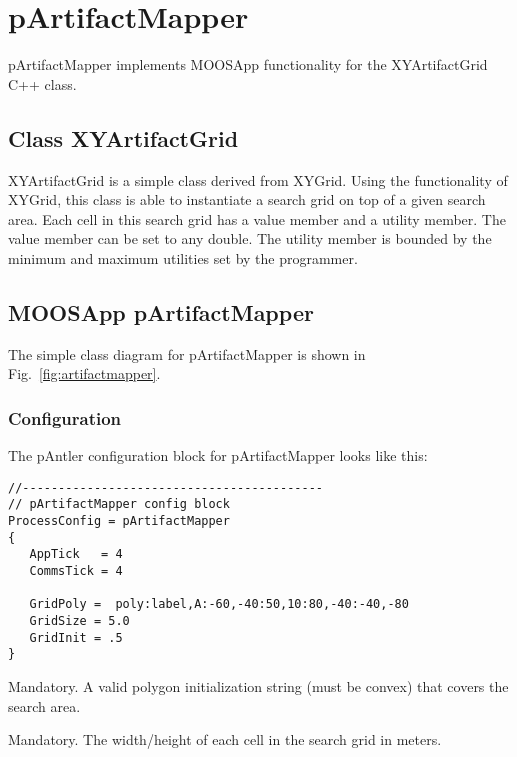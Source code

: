 \section{pArtifactMapper}
\label{pArtifactMapper}

pArtifactMapper implements MOOSApp functionality for the XYArtifactGrid C++ class.

\subsection{Class XYArtifactGrid}
\label{classXYArtifactGrid}

XYArtifactGrid is a simple class derived from XYGrid.  Using the functionality of XYGrid, this class is able to instantiate a search grid on top of a given search area.  Each cell in this search grid has a value member and a utility member.  The value member can be set to any double.  The utility member is bounded by the minimum and maximum utilities set by the programmer.

\subsection{MOOSApp pArtifactMapper}
\label{apppArtifactMapper}
The simple class diagram for pArtifactMapper is shown in Fig.~\ref{fig:artifactmapper}.


\subsubsection{Configuration}
The pAntler configuration block for pArtifactMapper looks like this:
\scriptsize
\begin{verbatim}
//------------------------------------------
// pArtifactMapper config block
ProcessConfig = pArtifactMapper
{
   AppTick   = 4
   CommsTick = 4
   
   GridPoly =  poly:label,A:-60,-40:50,10:80,-40:-40,-80
   GridSize = 5.0
   GridInit = .5
}
\end{verbatim}
\normalsize

\begin{hangpar}{\pin}{}
Mandatory. A valid polygon initialization string (must be convex) that covers the search area.
\end{hangpar}

\begin{hangpar}{\pin}{}
Mandatory. The width/height of each cell in the search grid in meters.
\end{hangpar}

